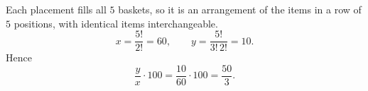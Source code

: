 Each placement fills all $5$ baskets, so it is an arrangement of the items in a row of $5$ positions, with identical items interchangeable.
\[x=\dfrac{5!}{2!}=60,\qquad y=\dfrac{5!}{3!\,2!}=10.\]
Hence
\[\dfrac{y}{x}\cdot100=\dfrac{10}{60}\cdot100=\boxed{\dfrac{50}{3}}.\]
